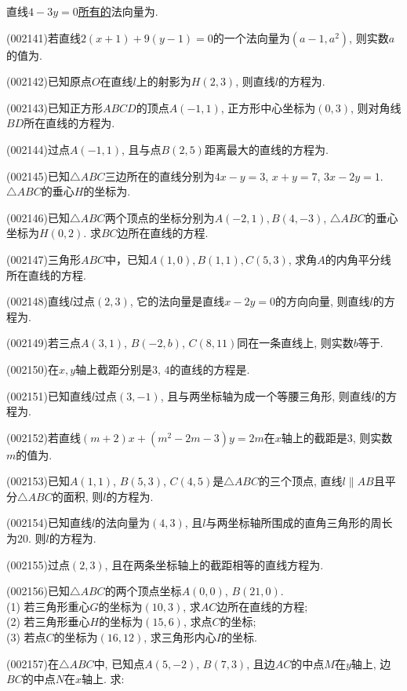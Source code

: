 直线$4-3y=0$\underline{所有的}法向量为.
\item (002141)若直线$2(x+1)+9(y-1)=0$的一个法向量为$(a-1,a^2)$, 则实数$a$的值为.
\item (002142)已知原点$O$在直线$l$上的射影为$H(2,3)$, 则直线$l$的方程为.
\item (002143)已知正方形$ABCD$的顶点$A(-1,1)$, 正方形中心坐标为$(0,3)$, 则对角线$BD$所在直线的方程为.
\item (002144)过点$A(-1,1)$, 且与点$B(2,5)$距离最大的直线的方程为.
\item (002145)已知$\triangle ABC$三边所在的直线分别为$4x-y=3$, $x+y=7$, $3x-2y=1$. $\triangle ABC$的垂心$H$的坐标为.
\item (002146)已知$\triangle ABC$两个顶点的坐标分别为$A(-2,1),B(4,-3)$, $\triangle ABC$的垂心坐标为$H(0,2)$.
求$BC$边所在直线的方程.
\item (002147)三角形$ABC$中，已知$A(1,0),B(1,1),C(5,3)$, 求角$A$的内角平分线所在直线的方程.
\item (002148)直线$l$过点$(2,3)$, 它的法向量是直线$x-2y=0$的方向向量, 则直线$l$的方程为.
\item (002149)若三点$A(3,1)$, $B(-2,b)$, $C(8,11)$同在一条直线上, 则实数$b$等于.
\item (002150)在$x,y$轴上截距分别是$3$, $4$的直线的方程是.
\item (002151)已知直线$l$过点$(3,-1)$, 且与两坐标轴为成一个等腰三角形, 则直线$l$的方程为.
\item (002152)若直线$(m+2)x+(m^2-2m-3)y=2m$在$x$轴上的截距是$3$, 则实数$m$的值为.
\item (002153)已知$A(1,1)$, $B(5,3)$, $C(4,5)$是$\triangle ABC$的三个顶点,
直线$l\parallel AB$且平分$\triangle ABC$的面积, 则$l$的方程为.
\item (002154)已知直线$l$的法向量为$(4,3)$, 且$l$与两坐标轴所围成的直角三角形的周长为$20$.
则$l$的方程为.
\item (002155)过点$(2,3)$, 且在两条坐标轴上的截距相等的直线方程为.
\item (002156)已知$\triangle ABC$的两个顶点坐标$A(0,0)$, $B(21,0)$.\\ 
(1) 若三角形重心$G$的坐标为$(10,3)$, 求$AC$边所在直线的方程;\\ 
(2) 若三角形垂心$H$的坐标为$(15,6)$, 求点$C$的坐标;\\ 
(3) 若点$C$的坐标为$(16,12)$, 求三角形内心$I$的坐标.
\item (002157)在$\triangle ABC$中, 已知点$A(5,-2)$, $B(7,3)$, 且边$AC$的中点$M$在$y$轴上, 边$BC$的中点$N$在$x$轴上. 求:\\ 
